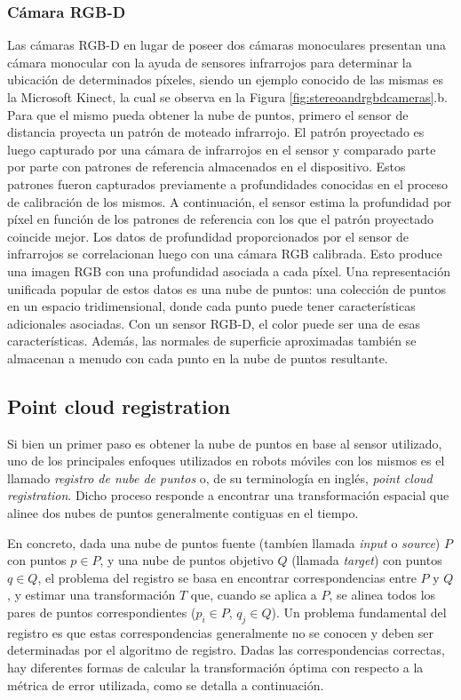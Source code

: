 \subsubsection{Cámara RGB-D}
Las cámaras RGB-D\cite{hogman2011} en lugar de poseer dos cámaras monoculares presentan una cámara monocular con la ayuda de sensores infrarrojos para determinar la ubicación de determinados píxeles, siendo un ejemplo conocido de las mismas es la Microsoft Kinect, la cual se observa en la Figura \ref{fig:stereoandrgbdcameras}.b. Para que el mismo pueda obtener la nube de puntos, primero el sensor de distancia proyecta un patrón de moteado infrarrojo. El patrón proyectado es luego capturado por una cámara de infrarrojos en el sensor y comparado parte por parte con patrones de referencia almacenados en el dispositivo. Estos patrones fueron capturados previamente a profundidades conocidas en el proceso de calibración de los mismos. A continuación, el sensor estima la profundidad por píxel en función de los patrones de referencia con los que el patrón proyectado coincide mejor. Los datos de profundidad proporcionados por el sensor de infrarrojos se correlacionan luego con una cámara RGB calibrada. Esto produce una imagen RGB con una profundidad asociada a cada píxel. Una representación unificada popular de estos datos es una nube de puntos: una colección de puntos en un espacio tridimensional, donde cada punto puede tener características adicionales asociadas. Con un sensor RGB-D, el color puede ser una de esas características. Además, las normales de superficie aproximadas también se almacenan a menudo con cada punto en la nube de puntos resultante.

\subsection{Point cloud registration}
Si bien un primer paso es obtener la nube de puntos en base al sensor utilizado, uno de los principales enfoques utilizados en robots móviles con los mismos es el llamado \textit{registro de nube de puntos} o, de su terminología en inglés, \textit{point cloud registration}. Dicho proceso responde a encontrar una transformación espacial que alinee dos nubes de puntos generalmente contiguas en el tiempo.

En concreto, dada una nube de puntos fuente (tambíen llamada \textit{input} o \textit{source}) $P$ con puntos $p \in P$, y una nube de puntos objetivo $Q$ (llamada \textit{target}) con puntos $q \in Q$, el problema del registro se basa en encontrar correspondencias entre $P$ y $Q$, y estimar una transformación $T$ que, cuando se aplica a $P$, se alinea todos los pares de puntos correspondientes ($p_i \in P$, $q_j \in Q$). Un problema fundamental del registro es que estas correspondencias generalmente no se conocen y deben ser determinadas por el algoritmo de registro. Dadas las correspondencias correctas, hay diferentes formas de calcular la transformación óptima con respecto a la métrica de error utilizada, como se detalla a continuación.

